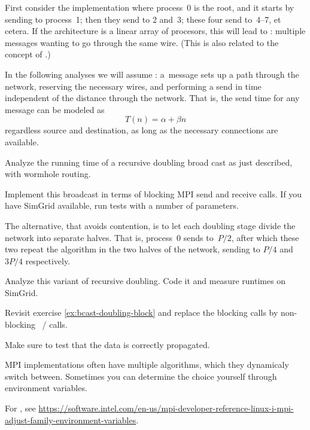 First consider the implementation where process~0 is the root, and it
starts by sending to process~1; then they send to 2 and~3; these four
send to~4--7, et cetera. If the architecture is a linear array of
procesors, this will lead to : multiple messages
wanting to go through the same wire. (This is also related to the
concept of .)

In the following analyses we will assume :
a~message sets up a path through the network, reserving the necessary
wires, and performing a send in time independent of the distance
through the network. That is, the send time for any message can be
modeled as \[ T(n)=\alpha+\beta n \] regardless source and
destination, as long as the necessary connections are available. 

\begin{exercise}
  \label{ex:bcast-doubling-block}
  Analyze the running time of a recursive doubling broad cast as just
  described, with wormhole routing.

  Implement this broadcast in terms of blocking MPI send and receive calls.
  If you have SimGrid available, run
  tests with a number of parameters.
\end{exercise}

The alternative, that avoids contention, is to let each doubling stage
divide the network into separate halves. That is, process~0 sends
to~$P/2$, after which these two repeat the algorithm in the two halves
of the network, sending to $P/4$ and $3P/4$ respectively.

\begin{exercise}
  Analyze this variant of recursive doubling. Code it and measure
  runtimes on SimGrid.
\end{exercise}

\begin{exercise}
  \label{ex:bcast-doubling-nonblock}
  Revisit exercise \ref{ex:bcast-doubling-block} and replace the
  blocking calls by non-blocking ~/  calls.

  Make sure to test that the data is correctly propagated.
\end{exercise}

MPI implementations often have multiple algorithms, which they
dynamicaly switch between. Sometimes you can determine the choice yourself
through environment variables.

\begin{taccnote}
  For , see
  \url{https://software.intel.com/en-us/mpi-developer-reference-linux-i-mpi-adjust-family-environment-variables}.
\end{taccnote}
